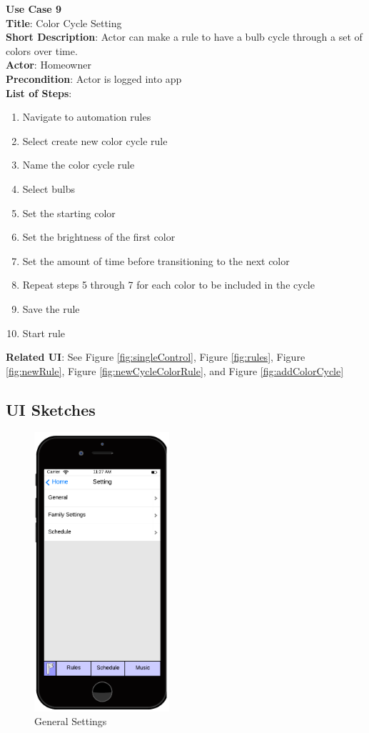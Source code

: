 \documentclass[12pt]{article}
\begin{document}
\begin{samepage}
  \begin{framed}
    \textbf{Use Case 9}\\
    \textbf{Title}: Color Cycle Setting\\
    \textbf{Short Description}: Actor can make a rule to have a bulb cycle through a set of colors over time. \\
    \textbf{Actor}: Homeowner \\
    \textbf{Precondition}: Actor is logged into app \\
    \textbf{List of Steps}:
    \begin{enumerate}
     \item Navigate to automation rules
     \item Select create new color cycle rule
     \item Name the color cycle rule
     \item Select bulbs
     \item Set the starting color
     \item Set the brightness of the first color
     \item Set the amount of time before transitioning to the next color
     \item Repeat steps 5 through 7 for each color to be included in the cycle
     \item Save the rule
     \item Start rule
    \end{enumerate}
    \textbf{Related UI}:  See Figure \ref{fig:singleControl}, Figure \ref{fig:rules}, Figure \ref{fig:newRule}, Figure \ref{fig:newCycleColorRule}, and Figure \ref{fig:addColorCycle}
  \end{framed}
\end{samepage}



\subsection{UI Sketches}
  \begin{figure}[ht!]
    \centering
    \includegraphics[width=50mm]{Settings.png}
    \caption{General Settings}
    \label{fig:settings}
  \end{figure}
  
\end{document}

